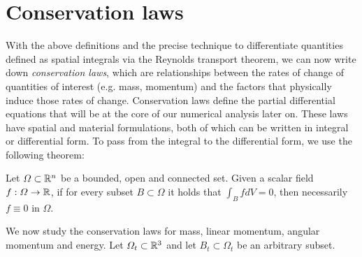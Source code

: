 \section{Conservation laws}
With the above definitions and the precise technique to differentiate quantities defined as spatial integrals via the Reynolds transport theorem, we can now write down \textit{conservation laws}, which are relationships between the rates of change of quantities of interest (e.g. mass, momentum) and the factors that physically induce those rates of change. Conservation laws define the partial differential equations that will be at the core of our numerical analysis later on. These laws have spatial and material formulations, both of which can be written in integral or differential form. To pass from the integral to the differential form, we use the following theorem: 
\begin{theorem}
    Let $\Omega\subset\mathbb{R}^n$ be a bounded, open and connected set. Given a scalar field $f:\Omega\to \mathbb{R}$, if for every subset $B\subset \Omega$ it holds that $\int_B fdV = 0$, then necessarily $f\equiv 0$ in $\Omega$. 
\end{theorem}
We now study the conservation laws for mass, linear momentum, angular momentum and energy. Let $\Omega_t\subset\mathbb{R}^3$ and let $B_t\subset\Omega_t$ be an arbitrary subset. 
